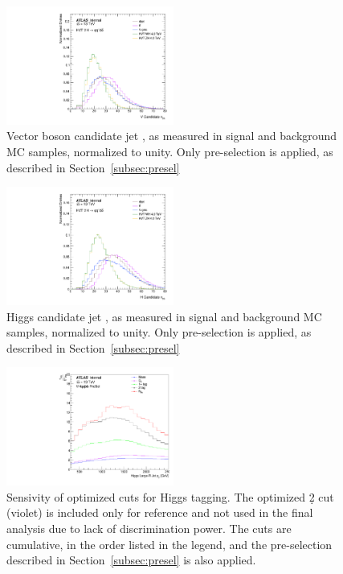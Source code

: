 \begin{figure}[htbp!]
\begin{center}
    \includegraphics[width=0.49\textwidth]{VHqqbb_SimpleSigBkgMC_ntrkVVJJ_V.pdf}
\end{center}
\caption{Vector boson candidate jet \ntrk, as measured in signal and background MC samples, normalized to unity. Only pre-selection is applied, as described in Section~\ref{subsec:presel} }
\label{fig:simple_mc_ntrkV}
\end{figure}

\begin{figure}[htbp!]
\begin{center}
    \includegraphics[width=0.49\textwidth]{VHqqbb_SimpleSigBkgMC_ntrkVVJJ_H.pdf}
\end{center}
\caption{Higgs candidate jet \ntrk, as measured in signal and background MC samples, normalized to unity. Only pre-selection is applied, as described in Section~\ref{subsec:presel} }
\label{fig:simple_mc_ntrkH}
\end{figure}

\begin{figure}[htbp!]
\begin{center}
    \includegraphics[width=0.49\textwidth]{PlotHTagSensitivityWithD2.pdf}
\end{center}
\caption{Sensivity of optimized cuts for Higgs tagging. The optimized \d2 cut (violet) is included only for reference and not used in the final analysis due to lack of discrimination power.
    The cuts are cumulative, in the order listed in the legend, and the pre-selection described in Section~\ref{subsec:presel} is also applied.
}
\label{fig:htag_sens_d2}
\end{figure}

